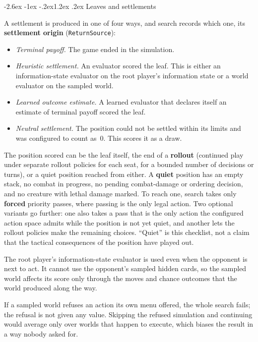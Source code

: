 \documentclass[11pt,a4paper]{article}
\makeatletter
\renewcommand\subsection{\@startsection{subsection}{2}{\z@}
  {-2.6ex \@plus -1ex \@minus -.2ex}{1.2ex \@plus .2ex}
  {\normalfont\large\sffamily\bfseries\color{ink}}}
\theoremstyle{plain}
\theoremstyle{definition}
\newcommand{\term}[1]{\textbf{#1}}
\newcommand{\code}[1]{\texttt{\small #1}}
\makeatother
\begin{document}
\subsection{Leaves and settlements}
\label{sec:settlement}

A settlement is produced in one of four ways, and search records which one,
its \term{settlement origin} (\code{ReturnSource}):
\begin{itemize}
\item \emph{Terminal payoff.} The game ended in the simulation.
\item \emph{Heuristic settlement.} An evaluator scored the leaf. This is either an
  information-state evaluator on the root player's information state or a
  world evaluator on the sampled world.
\item \emph{Learned outcome estimate.} A learned evaluator that declares itself an
  estimate of terminal payoff scored the leaf.
\item \emph{Neutral settlement.} The position could not be settled within its
  limits and was configured to count as~$0$. This scores it as a draw.
\end{itemize}
The position scored can be the leaf itself, the end of a \term{rollout}
(continued play under separate rollout policies for each seat, for a bounded
number of decisions or turns), or a quiet position reached from either. A
\term{quiet} position has an empty stack, no combat in progress, no pending
combat-damage or ordering decision, and no creature with lethal damage marked.
To reach one, search takes only \term{forced} priority passes, where passing
is the only legal action. Two optional variants go further: one also takes a
pass that is the only action the configured action space admits while the
position is not yet quiet, and another lets the rollout policies make the
remaining choices. ``Quiet'' is this checklist, not a claim that the tactical
consequences of the position have played out.

The root player's information-state evaluator is used even when the opponent
is next to act. It cannot use the opponent's sampled hidden cards, so the
sampled world affects its score only through the moves and chance outcomes
that the world produced along the way.

If a sampled world refuses an action its own menu offered, the whole search
fails; the refusal is not given any value. Skipping the refused simulation
and continuing would average only over worlds that happen to execute, which
biases the result in a way nobody asked for.
\end{document}
